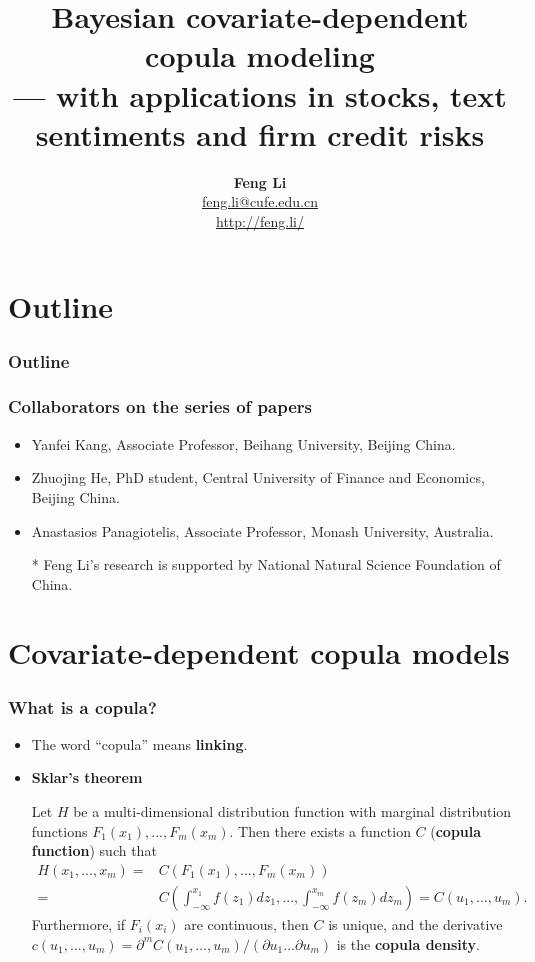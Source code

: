 \documentclass[10pt,aspectratio=169]{beamer}
\title[Covariate-Dependent Copula Modeling]{\textbf{Bayesian covariate-dependent copula
    modeling\\ --- with applications in stocks, text sentiments and firm credit risks}}
\author[Feng Li]{%
  \vspace{0.5cm}\textbf{Feng Li}
  \\\vspace{0.3cm}\url{feng.li@cufe.edu.cn}\\\url{http://feng.li/}}
\institute[SAM.CUFE.EDU.CN]{\footnotesize{\textbf{School of Statistics and
      Mathematics\\ Central University of Finance and Economics}}}
\date{}
\begin{document}
\begin{frame}[plain]
  \addtocounter{framenumber}{-1}
  \titlepage
\end{frame}

\section*{Outline}
\begin{frame}
  \frametitle{Outline}
  \addtocounter{framenumber}{-1}
  \tableofcontents
\end{frame}


\begin{frame}
  \frametitle{Collaborators on the series of papers}
  \begin{itemize}
  \item Yanfei Kang, Associate Professor, Beihang University, Beijing China.
  \item Zhuojing He, PhD student, Central University of Finance and Economics, Beijing
    China.
  \item Anastasios Panagiotelis, Associate Professor, Monash University, Australia.

    \vspace{2cm} \color{blue} \item [*] Feng Li's research is supported by National
    Natural Science Foundation of China.

  \end{itemize}


\end{frame}


\section{Covariate-dependent copula models}


\begin{frame}
  \frametitle{What is a copula?}
  \begin{itemize}
  \item The word ``copula'' means \textbf{linking}.
  \item \textbf{Sklar's theorem}

    Let $H$ be a multi-dimensional distribution function with marginal
    distribution functions $F_1(x_1),...,F_m(x_m)$. Then there exists a
    function $C$ (\textbf{copula function}) such that
    \begin{equation*}
      \begin{split}
        H(x_1,...,x_m)= & C(F_1(x_1),...,F_m(x_m))\\
        =&C\left(\int_{-\infty}^{x_1}f(z_1)dz_1,...,\int_{-\infty}^{x_m}f(z_m)dz_m\right)=C(u_1,...,u_m).
      \end{split}
    \end{equation*}
    Furthermore, if $F_i(x_i)$ are continuous, then $C$ is unique, and the derivative $c(u_1,...,u_m)= \partial^m C(u_1,...,u_m)/(\partial u_1...
    \partial u_m)$ is the \textbf{copula density}.

  \end{itemize}
\end{frame}
\end{document}
